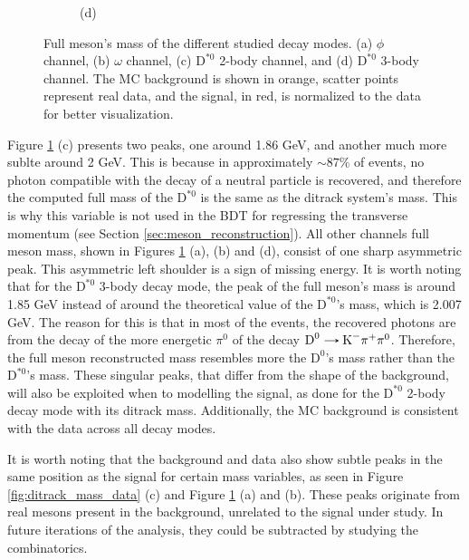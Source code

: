 \begin{figure}[!ht]
\begin{subfigure}[t]{0.50\mylength}
        \vspace*{-0.2cm}
        \caption{\footnotesize (d)}
    \end{subfigure}%
\caption{Full meson's mass of the different studied decay modes. (a) $\phi$ channel, (b) $\omega$ channel, (c) $\text{D}^{*0}$ 2-body channel, and (d) $\text{D}^{*0}$ 3-body channel. The MC background is shown in orange, scatter points represent real data, and the signal, in red, is normalized to the data for better visualization.}
\label{fig:full_mass_data}
    \vspace*{-0.0cm}
\end{figure}
Figure \ref{fig:full_mass_data} (c) presents two peaks, one around 1.86 GeV, and another much more sublte around 2 GeV. This is because in approximately $\sim 87\%$ of events, no photon compatible with the decay of a neutral particle is recovered, and therefore the computed full mass of the $\text{D}^{*0}$ is the same as the ditrack system's mass. This is why this variable is not used in the BDT for regressing the transverse momentum (see Section \ref{sec:meson_reconstruction}). All other channels full meson mass, shown in Figures \ref{fig:full_mass_data} (a), (b) and (d), consist of one sharp asymmetric peak. This asymmetric left shoulder is a sign of missing energy. It is worth noting that for the $\text{D}^{*0}$ 3-body decay mode, the peak of the full meson's mass is around 1.85 GeV instead of around the theoretical value of the $\text{D}^{*0}$'s mass, which is 2.007 GeV. The reason for this is that in most of the events, the recovered photons are from the decay of the more energetic $\pi^0$ of the decay $\text{D}^{0}\decaysto \text{K}^{-}\pi^{+}\pi^0$. Therefore, the full meson reconstructed mass resembles more the $\text{D}^{0}$'s mass rather than the $\text{D}^{*0}$'s mass. These singular peaks, that differ from the shape of the background, will also be exploited when to modelling the signal, as done for the $\text{D}^{*0}$ 2-body decay mode with its ditrack mass. Additionally, the MC background is consistent with the data across all decay modes.

It is worth noting that the background and data also show subtle peaks in the same position as the signal for certain mass variables, as seen in Figure \ref{fig:ditrack_mass_data} (c) and Figure \ref{fig:full_mass_data} (a) and (b). These peaks originate from real mesons present in the background, unrelated to the signal under study. In future iterations of the analysis, they could be subtracted by studying the combinatorics.

